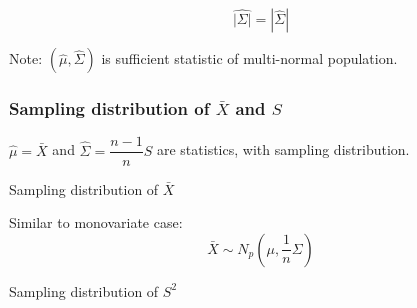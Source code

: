     \begin{equation}
        \widehat{|\Sigma |} =|\hat{\Sigma } | 
    \end{equation}
    
    
        Note: $ (\hat{\mu} , \hat{\Sigma} ) $ is sufficient statistic of multi-normal population.







    
        
\subsubsection{Sampling distribution of $ \bar{X} $ and $ S $}
        $ \hat{\mu}=\bar{X} $ and $ \hat{\Sigma}=\dfrac{n-1}{n}S $ are statistics, with sampling distribution.



    \begin{point}
        Sampling distribution of $ \bar{X} $
    \end{point}

    Similar to monovariate case:
    \begin{equation}
        \bar{X}\sim N_p(\mu,\dfrac{1}{n}\Sigma ) 
    \end{equation}
    
    \begin{point}
        Sampling distribution of $ S^2 $
    \end{point}
    
